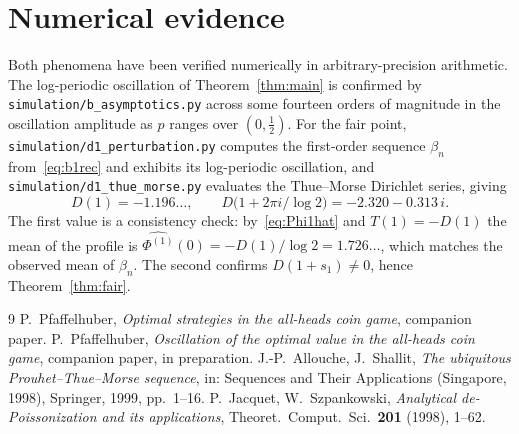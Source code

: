 \documentclass[11pt]{article}
\theoremstyle{definition}
\begin{document}
\section{Numerical evidence}\label{sec:numerics}

Both phenomena have been verified numerically in arbitrary-precision
arithmetic. The log-periodic oscillation of Theorem~\ref{thm:main} is
confirmed by \texttt{simulation/b\_asymptotics.py} across some fourteen
orders of magnitude in the oscillation amplitude as $p$ ranges over
$(0,\tfrac12)$. For the fair point,
\texttt{simulation/d1\_perturbation.py} computes the first-order
sequence $\beta_n$ from~\eqref{eq:b1rec} and exhibits its log-periodic
oscillation, and \texttt{simulation/d1\_thue\_morse.py} evaluates the
Thue--Morse Dirichlet series, giving
\[
  D(1)=-1.196\ldots,\qquad
  D\bigl(1+2\pi i/\log2\bigr)=-2.320-0.313\,i .
\]
The first value is a consistency check: by~\eqref{eq:Phi1hat} and
$T(1)=-D(1)$ the mean of the profile is
$\widehat{\Phi^{(1)}}(0)=-D(1)/\log2=1.726\ldots$, which matches the
observed mean of $\beta_n$. The second confirms $D(1+s_1)\ne0$, hence
Theorem~\ref{thm:fair}.

\begin{thebibliography}{9}
  P.~Pfaffelhuber,
  \emph{Optimal strategies in the all-heads coin game},
  companion paper.
  P.~Pfaffelhuber,
  \emph{Oscillation of the optimal value in the all-heads coin game},
  companion paper, in preparation.
  J.-P.~Allouche, J.~Shallit,
  \emph{The ubiquitous Prouhet--Thue--Morse sequence},
  in: Sequences and Their Applications (Singapore, 1998),
  Springer, 1999, pp.~1--16.
  P.~Jacquet, W.~Szpankowski,
  \emph{Analytical de-Poissonization and its applications},
  Theoret.\ Comput.\ Sci.\ \textbf{201} (1998), 1--62.
\end{thebibliography}
\end{document}
